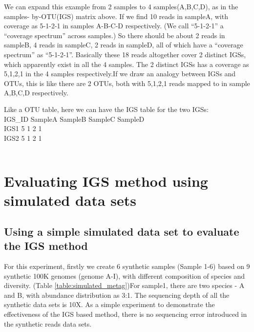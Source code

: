 We can expand this example from 2 samples to 4 samples(A,B,C,D), as in the samples-
by-OTU(IGS) matrix above. If we find 10 reads in sampleA, with coverage as 5-1-2-1 in samples 
A-B-C-D respectively. (We call ``5-1-2-1'' a ``coverage  spectrum'' across samples.)
So there should be about 2 reads in sampleB, 4 reads in sampleC, 2 reads 
in sampleD, all of which have a ``coverage spectrum'' as ``5-1-2-1''. Basically 
these 18 reads altogether cover 2 distinct IGSs, which apparently exist in 
all the 4 samples. The 2 distinct IGSs has a coverage as 5,1,2,1 in the 
4 samples respectively.If we draw an analogy between IGSs and OTUs, this is like there are 2 OTUs, 
both with 5,1,2,1 reads mapped to in sample A,B,C,D respectively.

Like a OTU table, here we can have the IGS table for the two IGSs:
\\
    IGS\_ID SampleA SampleB SampleC SampleD\\
    IGS1   5       1       2       1\\
    IGS2   5       1       2       1\\
\\
    
    
    
\section{Evaluating IGS method using simulated data sets}
\subsection{Using a simple simulated data set to evaluate the IGS method}


For this experiment, firstly we create 6 synthetic samples (Sample 1-6) 
based on 9 synthetic 100K genomes (genome A-I), with different composition of species and diversity. 
(Table \ref{table:simulated_metag})For sample1, there are two species - A and B, with abundance distribution as 3:1.
The sequencing depth of all the synthetic data sets is 10X. 
As a simple experiment to demonstrate the effectiveness of the IGS based method, 
there is no sequencing error introduced in the 
synthetic reads data sets.

